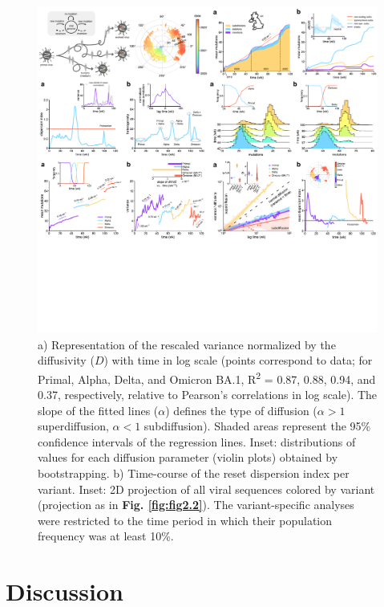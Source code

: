 \begin{figure}[t]
    \centering
    \includegraphics[trim={25.8cm 13.5cm 0.1cm 22.7cm},clip, width=\linewidth]{assets/Ch2Fig.pdf}
    \caption{a) Representation of the rescaled variance normalized by the diffusivity ($D$) with time in log scale (points correspond to data; for Primal, Alpha, Delta, and Omicron BA.1, R\textsuperscript{2} = 0.87, 0.88, 0.94, and 0.37, respectively, relative to Pearson's correlations in log scale). The slope of the fitted lines ($\alpha$) defines the type of diffusion ($\alpha>1$ superdiffusion, $\alpha<1$ subdiffusion). Shaded areas represent the 95\% confidence intervals of the regression lines. Inset: distributions of values for each diffusion parameter (violin plots) obtained by bootstrapping. b) Time-course of the reset dispersion index per variant. Inset: 2D projection of all viral sequences colored by variant (projection as in \textbf{Fig. \ref{fig:fig2.2}}). The variant-specific analyses were restricted to the time period in which their population frequency was at least 10\%.}\label{fig:fig2.7}
\end{figure}

\section{Discussion}

